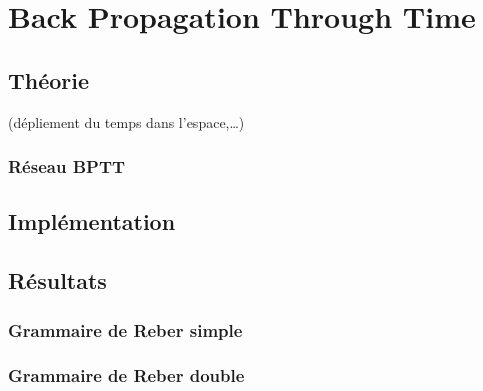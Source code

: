 
\chapter{Back Propagation Through Time}

\section{Théorie}
(dépliement du temps dans l'espace,\ldots)

\subsection{Réseau BPTT}

\section{Implémentation}

\section{Résultats}
\subsection{Grammaire de Reber simple}
\subsection{Grammaire de Reber double}

